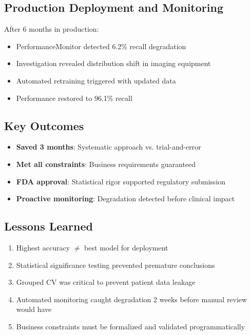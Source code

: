 \subsection{Production Deployment and Monitoring}

After 6 months in production:
\begin{itemize}
    \item PerformanceMonitor detected 6.2\% recall degradation
    \item Investigation revealed distribution shift in imaging equipment
    \item Automated retraining triggered with updated data
    \item Performance restored to 96.1\% recall
\end{itemize}

\subsection{Key Outcomes}

\begin{itemize}
    \item \textbf{Saved 3 months}: Systematic approach vs. trial-and-error
    \item \textbf{Met all constraints}: Business requirements guaranteed
    \item \textbf{FDA approval}: Statistical rigor supported regulatory submission
    \item \textbf{Proactive monitoring}: Degradation detected before clinical impact
\end{itemize}

\subsection{Lessons Learned}

\begin{enumerate}
    \item Highest accuracy $\neq$ best model for deployment
    \item Statistical significance testing prevented premature conclusions
    \item Grouped CV was critical to prevent patient data leakage
    \item Automated monitoring caught degradation 2 weeks before manual review would have
    \item Business constraints must be formalized and validated programmatically
\end{enumerate}

